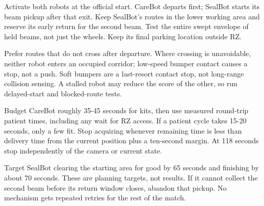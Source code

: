 \documentclass[10pt,a4paper]{article}
\begin{document}
Activate both robots at the official start. CareBot departs first; SealBot starts its beam pickup after that exit. Keep SealBot's routes in the lower working area and reserve its early return for the second beam. Test the entire swept envelope of held beams, not just the wheels. Keep its final parking location outside RZ.

Prefer routes that do not cross after departure. Where crossing is unavoidable, neither robot enters an occupied corridor; low-speed bumper contact causes a stop, not a push. Soft bumpers are a last-resort contact stop, not long-range collision sensing. A stalled robot may reduce the score of the other, so run delayed-start and blocked-route tests.

Budget CareBot roughly 35-45 seconds for kits, then use measured round-trip patient times, including any wait for RZ access. If a patient cycle takes 15-20 seconds, only a few fit. Stop acquiring whenever remaining time is less than delivery time from the current position plus a ten-second margin. At 118 seconds stop independently of the camera or current state.

Target SealBot clearing the starting area for good by 65 seconds and finishing by about 70 seconds. These are planning targets, not results. If it cannot collect the second beam before its return window closes, abandon that pickup. No mechanism gets repeated retries for the rest of the match.
\end{document}
